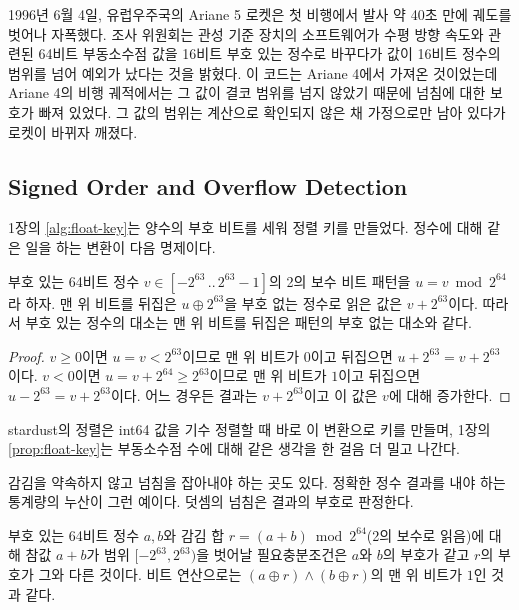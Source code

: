 \begin{aside}[Ariane 5의 첫 비행]
1996년 6월 4일, 유럽우주국의 Ariane 5 로켓은 첫 비행에서 발사 약 40초 만에 궤도를 벗어나 자폭했다. 조사 위원회는 관성 기준 장치의 소프트웨어가 수평 방향 속도와 관련된 64비트 부동소수점 값을 16비트 부호 있는 정수로 바꾸다가 값이 16비트 정수의 범위를 넘어 예외가 났다는 것을 밝혔다\cite{lions1996ariane}. 이 코드는 Ariane 4에서 가져온 것이었는데 Ariane 4의 비행 궤적에서는 그 값이 결코 범위를 넘지 않았기 때문에 넘침에 대한 보호가 빠져 있었다. 그 값의 범위는 계산으로 확인되지 않은 채 가정으로만 남아 있다가 로켓이 바뀌자 깨졌다.
\end{aside}

\subsection{Signed Order and Overflow Detection}

1장의 \cref{alg:float-key}는 양수의 부호 비트를 세워 정렬 키를 만들었다. 정수에 대해 같은 일을 하는 변환이 다음 명제이다.

\begin{proposition}
\label{prop:signflip}
부호 있는 64비트 정수 $v\in[-2^{63}\,..\,2^{63}-1]$의 2의 보수 비트 패턴을 $u=v\bmod2^{64}$라 하자. 맨 위 비트를 뒤집은 $u\oplus2^{63}$을 부호 없는 정수로 읽은 값은 $v+2^{63}$이다. 따라서 부호 있는 정수의 대소는 맨 위 비트를 뒤집은 패턴의 부호 없는 대소와 같다.
\end{proposition}

\begin{proof}
$v\ge0$이면 $u=v<2^{63}$이므로 맨 위 비트가 $0$이고 뒤집으면 $u+2^{63}=v+2^{63}$이다. $v<0$이면 $u=v+2^{64}\ge2^{63}$이므로 맨 위 비트가 $1$이고 뒤집으면 $u-2^{63}=v+2^{63}$이다. 어느 경우든 결과는 $v+2^{63}$이고 이 값은 $v$에 대해 증가한다.
\end{proof}

stardust의 정렬은 int64 값을 기수 정렬할 때 바로 이 변환으로 키를 만들며, 1장의 \cref{prop:float-key}는 부동소수점 수에 대해 같은 생각을 한 걸음 더 밀고 나간다.

감김을 약속하지 않고 넘침을 잡아내야 하는 곳도 있다. 정확한 정수 결과를 내야 하는 통계량의 누산이 그런 예이다. 덧셈의 넘침은 결과의 부호로 판정한다.

\begin{proposition}
\label{prop:add-overflow}
부호 있는 64비트 정수 $a,b$와 감김 합 $r=(a+b)\bmod2^{64}$(2의 보수로 읽음)에 대해 참값 $a+b$가 범위 $[-2^{63},2^{63})$을 벗어날 필요충분조건은 $a$와 $b$의 부호가 같고 $r$의 부호가 그와 다른 것이다. 비트 연산으로는 $(a\oplus r)\land(b\oplus r)$의 맨 위 비트가 $1$인 것과 같다.
\end{proposition}

